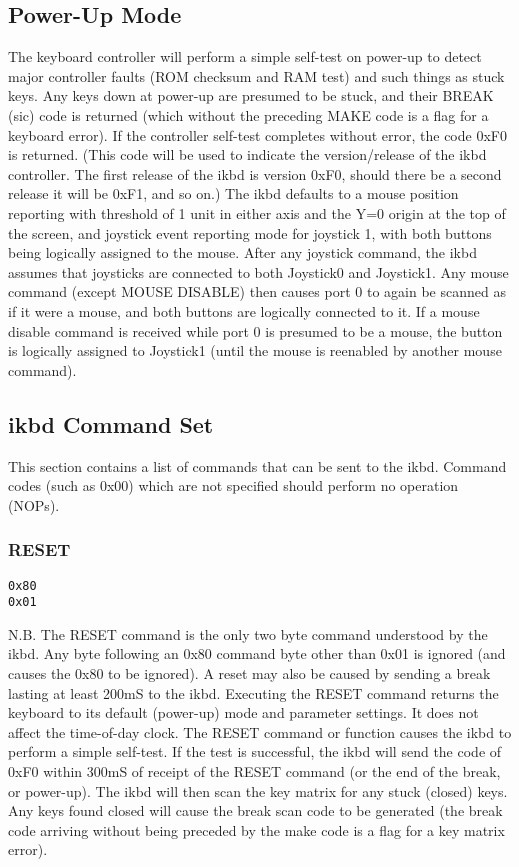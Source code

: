 \documentclass[a4paper,8pt,english]{sphinxmanual}
\begin{document}
\subsection{Power-Up Mode}
\label{input/devices/atarikbd:power-up-mode}
The keyboard controller will perform a simple self-test on power-up to detect
major controller faults (ROM checksum and RAM test) and such things as stuck
keys. Any keys down at power-up are presumed to be stuck, and their BREAK
(sic) code is returned (which without the preceding MAKE code is a flag for a
keyboard error). If the controller self-test completes without error, the code
0xF0 is returned. (This code will be used to indicate the version/release of
the ikbd controller. The first release of the ikbd is version 0xF0, should
there be a second release it will be 0xF1, and so on.)
The ikbd defaults to a mouse position reporting with threshold of 1 unit in
either axis and the Y=0 origin at the top of the screen, and joystick event
reporting mode for joystick 1, with both buttons being logically assigned to
the mouse. After any joystick command, the ikbd assumes that joysticks are
connected to both Joystick0 and Joystick1. Any mouse command (except MOUSE
DISABLE) then causes port 0 to again be scanned as if it were a mouse, and
both buttons are logically connected to it. If a mouse disable command is
received while port 0 is presumed to be a mouse, the button is logically
assigned to Joystick1 (until the mouse is reenabled by another mouse command).


\subsection{ikbd Command Set}
\label{input/devices/atarikbd:ikbd-command-set}
This section contains a list of commands that can be sent to the ikbd. Command
codes (such as 0x00) which are not specified should perform no operation
(NOPs).


\subsubsection{RESET}
\label{input/devices/atarikbd:reset}
\begin{Verbatim}[commandchars=\\\{\}]
0x80
0x01
\end{Verbatim}

N.B. The RESET command is the only two byte command understood by the ikbd.
Any byte following an 0x80 command byte other than 0x01 is ignored (and causes
the 0x80 to be ignored).
A reset may also be caused by sending a break lasting at least 200mS to the
ikbd.
Executing the RESET command returns the keyboard to its default (power-up)
mode and parameter settings. It does not affect the time-of-day clock.
The RESET command or function causes the ikbd to perform a simple self-test.
If the test is successful, the ikbd will send the code of 0xF0 within 300mS
of receipt of the RESET command (or the end of the break, or power-up). The
ikbd will then scan the key matrix for any stuck (closed) keys. Any keys found
closed will cause the break scan code to be generated (the break code arriving
without being preceded by the make code is a flag for a key matrix error).
\end{document}
